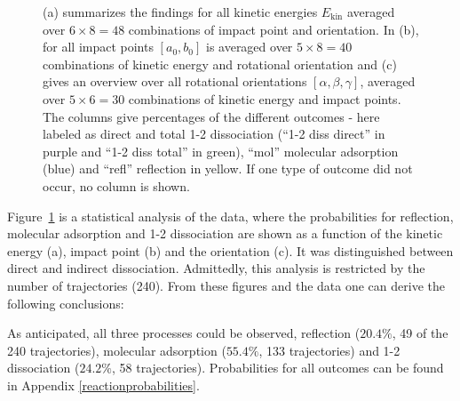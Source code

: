 \documentclass[11pt,DIV=13,BCOR=5mm,a4paper,headinclude]{scrbook}
\begin{document}
\begin{figure}[h!]
{(a) summarizes the findings for all kinetic energies $E_\textrm{kin}$ averaged over $6\times 8=48$ combinations of impact point and orientation.
In (b), for all impact points $[a_0,b_0]$ is averaged over $5 \times 8=40$ combinations of kinetic energy and rotational orientation and (c) gives an overview over all rotational orientations $[\alpha,\beta,\gamma]$, averaged over $5 \times 6=30$ combinations of kinetic energy and impact points.
The columns give percentages of the different outcomes - here labeled as direct and total 1-2 dissociation (``1-2 diss direct'' in purple and  ``1-2 diss total'' in green), ``mol'' molecular adsorption (blue) and ``refl'' reflection in yellow.
If one type of outcome did not occur, no column is shown.}
\label{abb:barchart_mic}
\end{figure}
Figure~\ref{abb:barchart_mic} is a statistical analysis of the data, where the probabilities for reflection, molecular adsorption and 1-2 dissociation are shown as a function of the kinetic energy (a), impact point (b) and the orientation (c).
It was distinguished between direct and indirect dissociation.
Admittedly, this analysis is restricted by the number of trajectories (240).
From these figures and the data one can derive the following conclusions:


As anticipated, all three processes could be observed, reflection ($20.4\%$, 49 of the 240 trajectories), molecular adsorption ($55.4\%$, 133 trajectories) and 1-2 dissociation ($24.2\%$, 58 trajectories).
Probabilities for all outcomes can be found in Appendix \ref{reactionprobabilities}.
\end{document}
